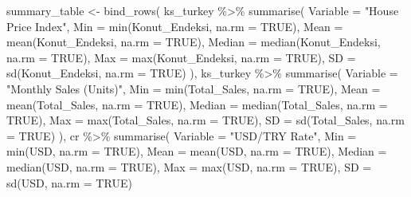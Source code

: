 \documentclass[
  11pt,
  a4paper,
  DIV=11,
  numbers=noendperiod]{scrartcl}
\newenvironment{Shaded}{\begin{snugshade}}{\end{snugshade}}
\newcommand{\AttributeTok}[1]{\textcolor[rgb]{0.40,0.45,0.13}{#1}}
\newcommand{\ConstantTok}[1]{\textcolor[rgb]{0.56,0.35,0.01}{#1}}
\newcommand{\FunctionTok}[1]{\textcolor[rgb]{0.28,0.35,0.67}{#1}}
\newcommand{\NormalTok}[1]{\textcolor[rgb]{0.00,0.23,0.31}{#1}}
\newcommand{\OtherTok}[1]{\textcolor[rgb]{0.00,0.23,0.31}{#1}}
\newcommand{\SpecialCharTok}[1]{\textcolor[rgb]{0.37,0.37,0.37}{#1}}
\newcommand{\StringTok}[1]{\textcolor[rgb]{0.13,0.47,0.30}{#1}}
\begin{document}
\begin{Shaded}
\begin{Highlighting}[]
\NormalTok{summary\_table }\OtherTok{\textless{}{-}} \FunctionTok{bind\_rows}\NormalTok{(}
\NormalTok{  ks\_turkey }\SpecialCharTok{\%\textgreater{}\%} \FunctionTok{summarise}\NormalTok{(}
    \AttributeTok{Variable =} \StringTok{"House Price Index"}\NormalTok{,}
    \AttributeTok{Min =} \FunctionTok{min}\NormalTok{(Konut\_Endeksi, }\AttributeTok{na.rm =} \ConstantTok{TRUE}\NormalTok{),}
    \AttributeTok{Mean =} \FunctionTok{mean}\NormalTok{(Konut\_Endeksi, }\AttributeTok{na.rm =} \ConstantTok{TRUE}\NormalTok{),}
    \AttributeTok{Median =} \FunctionTok{median}\NormalTok{(Konut\_Endeksi, }\AttributeTok{na.rm =} \ConstantTok{TRUE}\NormalTok{),}
    \AttributeTok{Max =} \FunctionTok{max}\NormalTok{(Konut\_Endeksi, }\AttributeTok{na.rm =} \ConstantTok{TRUE}\NormalTok{),}
    \AttributeTok{SD =} \FunctionTok{sd}\NormalTok{(Konut\_Endeksi, }\AttributeTok{na.rm =} \ConstantTok{TRUE}\NormalTok{)}
\NormalTok{  ),}
\NormalTok{  ks\_turkey }\SpecialCharTok{\%\textgreater{}\%} \FunctionTok{summarise}\NormalTok{(}
    \AttributeTok{Variable =} \StringTok{"Monthly Sales (Units)"}\NormalTok{,}
    \AttributeTok{Min =} \FunctionTok{min}\NormalTok{(Total\_Sales, }\AttributeTok{na.rm =} \ConstantTok{TRUE}\NormalTok{),}
    \AttributeTok{Mean =} \FunctionTok{mean}\NormalTok{(Total\_Sales, }\AttributeTok{na.rm =} \ConstantTok{TRUE}\NormalTok{),}
    \AttributeTok{Median =} \FunctionTok{median}\NormalTok{(Total\_Sales, }\AttributeTok{na.rm =} \ConstantTok{TRUE}\NormalTok{),}
    \AttributeTok{Max =} \FunctionTok{max}\NormalTok{(Total\_Sales, }\AttributeTok{na.rm =} \ConstantTok{TRUE}\NormalTok{),}
    \AttributeTok{SD =} \FunctionTok{sd}\NormalTok{(Total\_Sales, }\AttributeTok{na.rm =} \ConstantTok{TRUE}\NormalTok{)}
\NormalTok{  ),}
\NormalTok{  cr }\SpecialCharTok{\%\textgreater{}\%} \FunctionTok{summarise}\NormalTok{(}
    \AttributeTok{Variable =} \StringTok{"USD/TRY Rate"}\NormalTok{,}
    \AttributeTok{Min =} \FunctionTok{min}\NormalTok{(USD, }\AttributeTok{na.rm =} \ConstantTok{TRUE}\NormalTok{),}
    \AttributeTok{Mean =} \FunctionTok{mean}\NormalTok{(USD, }\AttributeTok{na.rm =} \ConstantTok{TRUE}\NormalTok{),}
    \AttributeTok{Median =} \FunctionTok{median}\NormalTok{(USD, }\AttributeTok{na.rm =} \ConstantTok{TRUE}\NormalTok{),}
    \AttributeTok{Max =} \FunctionTok{max}\NormalTok{(USD, }\AttributeTok{na.rm =} \ConstantTok{TRUE}\NormalTok{),}
    \AttributeTok{SD =} \FunctionTok{sd}\NormalTok{(USD, }\AttributeTok{na.rm =} \ConstantTok{TRUE}\NormalTok{)}

\end{Highlighting}
\end{Shaded}
\end{document}
